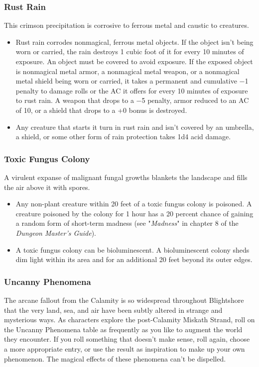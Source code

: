 \documentclass[10pt,a4paper,twoside,bg=print,twocolumn,openany,nodeprecatedcode]{dndbook}
\begin{document}
\subsubsection{Rust Rain}
This crimson precipitation is corrosive to ferrous metal and caustic to creatures.


\begin{itemize}
\item Rust rain corrodes nonmagical, ferrous metal objects. If the object isn't being worn or carried, the rain destroys 1 cubic foot of it for every 10 minutes of exposure. An object must be covered to avoid exposure. If the exposed object is nonmagical metal armor, a nonmagical metal weapon, or a nonmagical metal shield being worn or carried, it takes a permanent and cumulative −1 penalty to damage rolls or the AC it offers for every 10 minutes of exposure to rust rain. A weapon that drops to a −5 penalty, armor reduced to an AC of 10, or a shield that drops to a +0 bonus is destroyed.
\item Any creature that starts it turn in rust rain and isn't covered by an umbrella, a shield, or some other form of rain protection takes 1d4 acid damage.
\end{itemize}

\subsubsection{Toxic Fungus Colony}
A virulent expanse of malignant fungal growths blankets the landscape and fills the air above it with spores.


\begin{itemize}
\item Any non-plant creature within 20 feet of a toxic fungus colony is poisoned. A creature poisoned by the colony for 1 hour has a 20 percent chance of gaining a random form of short-term madness (see "\textit{Madness}" in chapter 8 of the \textit{Dungeon Master's Guide}).
\item A toxic fungus colony can be bioluminescent. A bioluminescent colony sheds dim light within its area and for an additional 20 feet beyond its outer edges.
\end{itemize}

\subsubsection{Uncanny Phenomena}
The arcane fallout from the Calamity is so widespread throughout Blightshore that the very land, sea, and air have been subtly altered in strange and mysterious ways. As characters explore the post-Calamity Miskath Strand, roll on the Uncanny Phenomena table as frequently as you like to augment the world they encounter. If you roll something that doesn't make sense, roll again, choose a more appropriate entry, or use the result as inspiration to make up your own phenomenon. The magical effects of these phenomena can't be dispelled.
\end{document}
